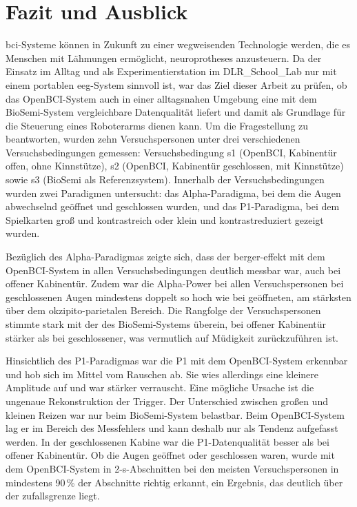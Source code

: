 \chapter{Fazit und Ausblick}

\acrshort{bci}-Systeme können in Zukunft zu einer wegweisenden Technologie werden, die es Menschen mit Lähmungen ermöglicht, \glspl{neuroprothese} anzusteuern. Da der Einsatz im Alltag und als Experimentierstation im DLR\_\allowbreak School\_\allowbreak Lab nur mit einem portablen \acrshort{eeg}-System sinnvoll ist, war das Ziel dieser Arbeit zu prüfen, ob das OpenBCI-System auch in einer alltagsnahen Umgebung eine mit dem BioSemi-System vergleichbare Datenqualität liefert und damit als Grundlage für die Steuerung eines Roboterarms dienen kann. Um die Fragestellung zu beantworten, wurden zehn Versuchspersonen unter drei verschiedenen Versuchsbedingungen gemessen: Versuchsbedingung s1 (OpenBCI, Kabinentür offen, ohne Kinnstütze), s2 (OpenBCI, Kabinentür geschlossen, mit Kinnstütze) sowie s3 (BioSemi als Referenzsystem). Innerhalb der Versuchsbedingungen wurden zwei Paradigmen untersucht: das Alpha-Paradigma, bei dem die Augen abwechselnd geöffnet und geschlossen wurden, und das P1-Paradigma, bei dem Spielkarten groß und kontrastreich oder klein und kontrastreduziert gezeigt wurden.

Bezüglich des Alpha-Paradigmas zeigte sich, dass der \gls{berger-effekt} mit dem OpenBCI-System in allen Versuchsbedingungen deutlich messbar war, auch bei offener Kabinentür. Zudem war die Alpha-Power bei allen Versuchspersonen bei geschlossenen Augen mindestens doppelt so hoch wie bei geöffneten, am stärksten über dem okzipito-parietalen Bereich. Die Rangfolge der Versuchspersonen stimmte stark mit der des BioSemi-Systems überein, bei offener Kabinentür stärker als bei geschlossener, was vermutlich auf Müdigkeit zurückzuführen ist.

Hinsichtlich des P1-Paradigmas war die P1 mit dem OpenBCI-System erkennbar und hob sich im Mittel vom Rauschen ab. Sie wies allerdings eine kleinere Amplitude auf und war stärker verrauscht. Eine mögliche Ursache ist die ungenaue Rekonstruktion der Trigger. Der Unterschied zwischen großen und kleinen Reizen war nur beim BioSemi-System belastbar. Beim OpenBCI-System lag er im Bereich des Messfehlers und kann deshalb nur als Tendenz aufgefasst werden. In der geschlossenen Kabine war die P1-Datenqualität besser als bei offener Kabinentür. Ob die Augen geöffnet oder geschlossen waren, wurde mit dem OpenBCI-System in 2-s-Abschnitten bei den meisten Versuchspersonen in mindestens 90\,\% der Abschnitte richtig erkannt, ein Ergebnis, das deutlich über der \gls{zufallsgrenze} liegt.

